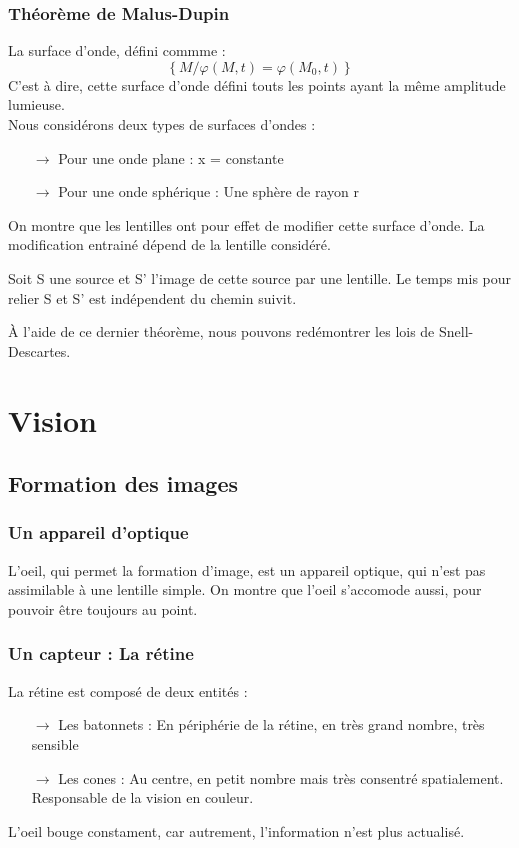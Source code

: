 \subsubsection{Théorème de Malus-Dupin}
\begin{theo}
La surface d'onde, défini commme : 
$$\left\lbrace M / \varphi(M,t) = \varphi(M_0,t) \right\rbrace $$
C'est à dire, cette surface d'onde défini touts les points ayant la même amplitude lumieuse.\\
Nous considérons deux types de surfaces d'ondes : 
\begin{itemize}
 \item[$\rightarrow$] Pour une onde plane : x = constante
 \item[$\rightarrow$] Pour une onde sphérique : Une sphère de rayon r
\end{itemize}
On montre que les lentilles ont pour effet de modifier cette surface d'onde. La modification entrainé dépend de la lentille considéré.
\end{theo}
\begin{theo}
Soit S une source et S' l'image de cette source par une lentille. Le temps mis pour relier S et S' est indépendent du chemin suivit.
\end{theo}
À l'aide de ce dernier théorème, nous pouvons redémontrer les lois de Snell-Descartes.
\section{Vision}
\subsection{Formation des images}
\subsubsection{Un appareil d'optique}
L'oeil, qui permet la formation d'image, est un appareil optique, qui n'est pas assimilable à une lentille simple. On montre que l'oeil s'accomode aussi, pour pouvoir être toujours au point.
\subsubsection{Un capteur : La rétine}
La rétine est composé de deux entités :
\begin{itemize}
 \item[$\rightarrow$] Les batonnets : En périphérie de la rétine, en très grand nombre, très sensible
  \item[$\rightarrow$] Les cones : Au centre, en petit nombre mais très consentré spatialement. Responsable de la vision en couleur.
\end{itemize}
L'oeil bouge constament, car autrement, l'information n'est plus actualisé.

